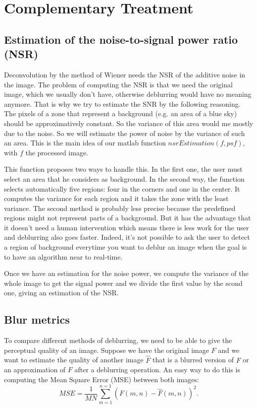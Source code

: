 \section{Complementary Treatment}

\subsection{Estimation of the noise-to-signal power ratio (NSR)}
\label{subsec:NSREstimation}
Deconvolution by the method of Wiener needs the NSR of the additive noise in the image. The problem of computing the NSR is that we need the original image, which we usually don't have, otherwise deblurring would have no meaning anymore. That is why we try to estimate the SNR by the following reasoning. The pixels of a zone that represent a background (e.g. an area of a blue sky) should be approximatively constant. So the variance of this area would me mostly due to the noise. So we will estimate the power of noise by the variance of such an area. This is the main idea of our matlab function $nsrEstimation(f,psf)$, with $f$ the processed image. %

This function proposes two ways to handle this. In the first one, the user must select an area that he considers as background. In the second way, the function selects automatically five regions: four in the corners and one in the center. It computes the variance for each region and it takes the zone with the least variance. The second method is probably less precise because the predefined regions might not represent parts of a background. But it has the advantage that it doesn't need a human intervention which means there is less work for the user and deblurring also goes faster. Indeed, it's not possible to ask the user to detect a region of background everytime you want to deblur an image when the goal is to have an algorithm near to real-time.

Once we have an estimation for the noise power, we compute the variance of the whole image to get the signal power and we divide the first value by the scond one, giving an estimation of the NSR.


\subsection{Blur metrics}

To compare different methods of deblurring, we need to be able to give the perceptual quality of an image. Suppose we have the original image $F$ and we want to estimate the quality of another image $\hat{F}$ that is a blurred version of $F$ or an approximation of $F$ after a deblurring operation. An easy way to do this is computing the Mean Square Error (MSE) between both images:
\begin{equation}
MSE=\frac{1}{MN} \sum\limits_{m=1}^{n=1}\left(F(m,n)-\hat{F}(m,n)\right)^2.
\end{equation}

